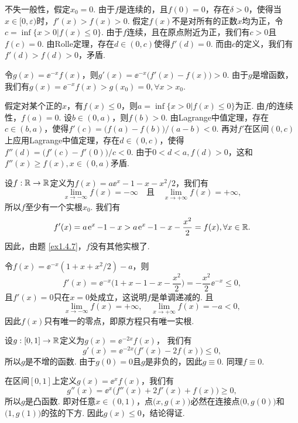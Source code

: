 \begin{ans}
  \method 不失一般性，假定$x_0=0$. 由于$f$是连续的，且$f(0)=0$，存在$\delta>0$，使得当$x\in[0,\varepsilon)$时，$f'(x)>f(x)>0$.
  假定$f(x)$不是对所有的正数$x$均为正，令$c=\inf\{x>0|f(x)\le0\}$.
  由于$f$连续，且在原点附近为正，我们有$c>0$且$f(c)=0$. 由Rolle定理，存在$d\in(0,c)$使得$f'(d)=0$. 而由$c$的定义，我们有$f'(d)>f(d)>0$，矛盾.

  \method 令$g(x)=\ee^{-x}f(x)$，则$g'(x)=\ee^{-x}\big(f'(x)-f(x)\big)>0$. 由于$g$是增函数，我们有$g(x)=\ee^{-x}f(x)>g(x_0)=0,\forall x>x_0$.
\end{ans}

\begin{ans}
  假定对某个正的$x$，有$f(x)\le0$，则$a=\inf\{x>0|f(x)\le0\}$为正. 由$f$的连续性，$f(a)=0$. 设$b\in(0,a)$，则$f(b)>0$. 由Lagrange中值定理，存在$c\in(b,a)$，使得$f'(c)=\big(f(a)-f(b)\big)/(a-b)<0$. 再对$f'$在区间$(0,c)$上应用Lagrange中值定理，存在$d\in(0,c)$，使得$f''(d)=\big(f'(c)-f'(0)\big)/c<0$. 由于$0<d<a,f(d)>0$，这和$f''(x)\ge f(x),x\in(0,a)$矛盾.
\end{ans}

\begin{ans}
  \method 设$f:\mathbb R\to\mathbb R$定义为$f(x)=a\ee^x-1-x-x^2/2$，我们有
  \[
    \lim_{x\to-\infty}f(x)=-\infty\quad\text{且}\quad
    \lim_{x\to+\infty}f(x) = +\infty,
  \]
  所以$f$至少有一个实根$x_0$. 我们有
  \[
    f'(x) = a\operatorname{\!\!\;\mathrm e}^x-1-x>a\operatorname{\!\!\;\mathrm e}^x-1-x-\frac{x^2}2
    =f(x),\forall x\in\mathbb R.
  \]
  因此，由题 \ref{ex1.4.7}，$f$没有其他实根了.

  \method 令$f(x)=\ee^{-x}(1+x+x^2/2)-a$，则
  \[
    f'(x)=\ee^{-x}\Big( 1+x-1-x-\frac{x^2}2 \Big)
    =-\frac{x^2}2\ee^{-x}\le 0,
  \]
  且$f'(x)=0$只在$x=0$处成立，这说明$f$是单调递减的. 且
  \[
    \lim_{x\to-\infty}f(x)=+\infty,\quad
    \lim_{x\to+\infty}f(x)=-a<0,
  \]
  因此$f(x)$只有唯一的零点，即原方程只有唯一实根.
\end{ans}

\begin{ans}
  设$g:[0,1]\to\mathbb R$定义为$g(x)=\ee^{-2x}f(x)$， 我们有
  \[
    g'(x)=\ee^{-2x}\big(f'(x)-2f(x)\big)\le0,
  \]
  所以$g$是不增的函数. 由于$g(0)=0$且$g$是非负的，因此$g\equiv0$. 同理$f\equiv0$.
\end{ans}

\begin{ans}
  在区间$[0,1]$上定义$g(x)=\ee^xf(x)$，我们有
  \[
    g''(x)=\ee^x\big(f''(x)+2f'(x)+f(x)\big)\ge0,
  \]
  所以$g$是凸函数. 即对任意$x\in(0,1)$，点$\big(x,g(x)\big)$必然在连接点$\big(0,g(0)\big)$和$\big(1,g(1)\big)$的弦的下方. 因此$g(x)\le0$，结论得证.
\end{ans}

